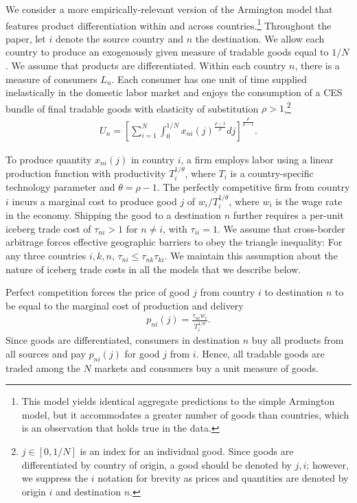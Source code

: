 \documentclass[12pt,dvips, ps2pdf]{article}
\begin{document}
We consider a more empirically-relevant version of the Armington model that features product differentiation within and across countries.\footnote{This model yields identical aggregate predictions to the simple Armington model, but it accommodates a greater number of goods than countries, which is an observation that holds true in the data.} Throughout the paper, let $i$ denote the source country and $n$ the destination. We allow each country to produce an exogenously given measure of tradable goods equal to $1/N$. We assume that products are differentiated. Within each country $n$, there is a measure of consumers $L_n$. Each consumer has one unit of time supplied inelastically in the domestic labor market and enjoys the consumption of a CES bundle of final tradable goods with elasticity of substitution $\rho> 1$,\footnote{$j\in[0,1/N]$ is an index for an individual good. Since goods are differentiated by country of origin, a good should be denoted by $j,i$; however, we suppress the $i$ notation for brevity as prices and quantities are denoted by origin $i$ and destination $n$.}
\begin{eqnarray*}
U_n = \left [\sum_{i=1}^N\int_0^{1/N} x_{ni}(j)^{\frac{\rho-1}{\rho}} dj\right]^\frac{\rho}{\rho-1}.
\end{eqnarray*}

To produce quantity $x_{ni}(j)$ in country $i$, a firm employs labor using a linear production function with productivity $T_i^{1/\theta}$, where $T_i$ is a country-specific technology parameter and $\theta=\rho-1$. The perfectly competitive firm from country $i$ incurs a marginal cost to produce good $j$ of $w_i/T_i^{1/\theta}$, where $w_i$ is the wage rate in the economy. Shipping the good to a destination $n$ further requires a per-unit iceberg trade cost of $\tau_{ni}>1$ for $n\neq i$, with $\tau_{ii}=1$. We assume that cross-border arbitrage forces effective geographic barriers to obey the triangle inequality: For any three countries $i,k,n$, $\tau_{ni}\leq \tau_{nk}\tau_{ki}$. We maintain this assumption about the nature of iceberg trade costs in all the models that we describe below.

Perfect competition forces the price of good $j$ from country $i$ to destination $n$ to be equal to the marginal cost of production and delivery
\begin{eqnarray*}
p_{ni}(j)=\frac{\tau_{ni}w_i}{T_i^{1/\theta}}.
\end{eqnarray*}
Since goods are differentiated, consumers in destination $n$ buy all products from all sources and pay $p_{ni}(j)$ for good $j$ from $i$. Hence, all tradable goods are traded among the $N$ markets and consumers buy a unit measure of goods.
\end{document}
